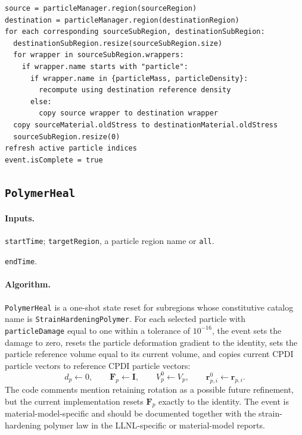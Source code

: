 \begin{lstlisting}[caption={MaterialSwap event pseudocode.}]
source = particleManager.region(sourceRegion)
destination = particleManager.region(destinationRegion)
for each corresponding sourceSubRegion, destinationSubRegion:
  destinationSubRegion.resize(sourceSubRegion.size)
  for wrapper in sourceSubRegion.wrappers:
    if wrapper.name starts with "particle":
      if wrapper.name in {particleMass, particleDensity}:
        recompute using destination reference density
      else:
        copy source wrapper to destination wrapper
  copy sourceMaterial.oldStress to destinationMaterial.oldStress
  sourceSubRegion.resize(0)
refresh active particle indices
event.isComplete = true
\end{lstlisting}

\subsection{\texttt{PolymerHeal}}
\label{subsec:event-polymer-heal}

\paragraph{Inputs.}
\begin{description}[leftmargin=*,style=nextline]
\item[\textbf{Required.}] \texttt{startTime}; \texttt{targetRegion}, a particle region name or \texttt{all}.
\item[\textbf{Optional.}] \texttt{endTime}.
\end{description}

\paragraph{Algorithm.}
\texttt{PolymerHeal} is a one-shot state reset for subregions whose constitutive catalog name is \texttt{StrainHardeningPolymer}.  For each selected particle with \texttt{particleDamage} equal to one within a tolerance of $10^{-16}$, the event sets the damage to zero, resets the particle deformation gradient to the identity, sets the particle reference volume equal to its current volume, and copies current CPDI particle vectors to reference CPDI particle vectors:
\begin{equation}
  d_p\leftarrow 0,
  \qquad
  \mathbf{F}_p\leftarrow\mathbf{I},
  \qquad
  V^0_p\leftarrow V_p,
  \qquad
  \mathbf{r}^0_{p,i}\leftarrow\mathbf{r}_{p,i}.
  \label{eq:polymer-heal-reset}
\end{equation}
The code comments mention retaining rotation as a possible future refinement, but the current implementation resets $\mathbf{F}_p$ exactly to the identity.  The event is material-model-specific and should be documented together with the strain-hardening polymer law in the LLNL-specific or material-model reports.


